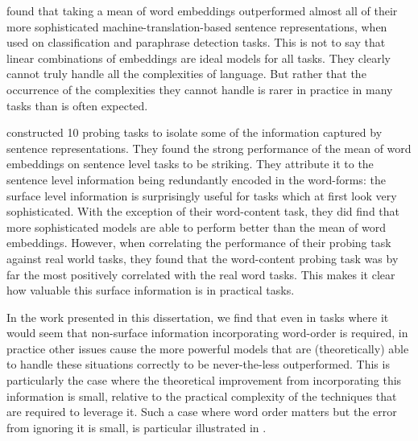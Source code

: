 \documentclass{book}
\begin{document}
\citet{acl2018bleuopposedmeaning} found that taking a mean of word embeddings outperformed almost all of their more sophisticated machine-translation-based sentence representations, when used on classification and paraphrase detection tasks.
This is not to say that linear combinations of embeddings are ideal models for all tasks.
They clearly cannot truly handle all the complexities of language.
But rather that the occurrence of the complexities they cannot handle is rarer in practice in many tasks than is often expected.

\citet{ac2018probingsentencevectors} constructed 10 probing tasks to isolate some of the information captured by sentence representations.
They found the strong performance of the mean of word embeddings on sentence level tasks to be striking.
They attribute it to the sentence level information being redundantly encoded in the word-forms: the surface level information is surprisingly useful for tasks which at first look very sophisticated.
With the exception of their word-content task, they did find that more sophisticated models are able to perform better than the mean of word embeddings.
However, when correlating the performance of their probing task against real world tasks,
they found that the word-content probing task was by far the most positively correlated with the real word tasks.
This makes it clear how valuable this surface information is in practical tasks.



In the work presented in this dissertation, 
we find that even in tasks where it would seem that non-surface information incorporating word-order is required,
in practice other issues cause the more powerful models that are (theoretically) able to handle these situations correctly to be never-the-less outperformed.
This is particularly the case where the theoretical improvement from incorporating this information is small, relative to the practical complexity of the techniques that are required to leverage it.
Such a case where word order matters but the error from ignoring it is small, is particular illustrated in .
\end{document}
